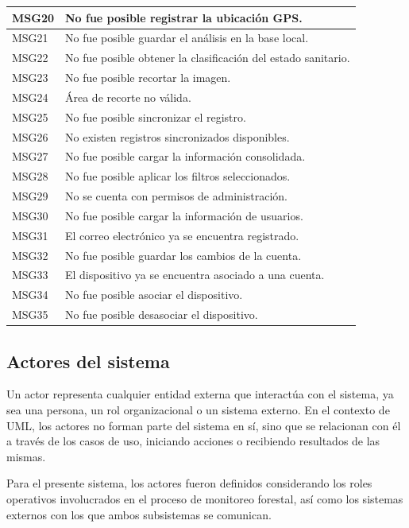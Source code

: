 \begin{longtable}{|p{2.5cm}|p{10.5cm}|}
MSG20 & No fue posible registrar la ubicación GPS. \\ \hline
MSG21 & No fue posible guardar el análisis en la base local. \\ \hline
MSG22 & No fue posible obtener la clasificación del estado sanitario. \\ \hline
MSG23 & No fue posible recortar la imagen. \\ \hline
MSG24 & Área de recorte no válida. \\ \hline
MSG25 & No fue posible sincronizar el registro. \\ \hline
MSG26 & No existen registros sincronizados disponibles. \\ \hline
MSG27 & No fue posible cargar la información consolidada. \\ \hline
MSG28 & No fue posible aplicar los filtros seleccionados. \\ \hline
MSG29 & No se cuenta con permisos de administración. \\ \hline
MSG30 & No fue posible cargar la información de usuarios. \\ \hline
MSG31 & El correo electrónico ya se encuentra registrado. \\ \hline
MSG32 & No fue posible guardar los cambios de la cuenta. \\ \hline
MSG33 & El dispositivo ya se encuentra asociado a una cuenta. \\ \hline
MSG34 & No fue posible asociar el dispositivo. \\ \hline
MSG35 & No fue posible desasociar el dispositivo. \\ \hline

\end{longtable}


\subsection{Actores del sistema}
Un actor representa cualquier entidad externa que interactúa con el sistema, ya sea una persona, un rol organizacional o un sistema externo. En el contexto de UML, los actores no forman parte del sistema en sí, sino que se relacionan con él a través de los casos de uso, iniciando acciones o recibiendo resultados de las mismas.

Para el presente sistema, los actores fueron definidos considerando los roles operativos involucrados en el proceso de monitoreo forestal, así como los sistemas externos con los que ambos subsistemas se comunican.

